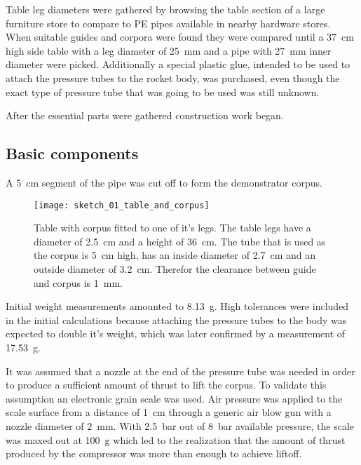 Table leg diameters were gathered by browsing the table section of a large furniture store to compare to PE pipes available in nearby hardware stores. When suitable guides and corpora were found they were compared until a \SI{37}{\centi\meter} high side table \cite{table} with a leg diameter of \SI{25}{\milli\meter} and a pipe with \SI{27}{\milli\meter} inner diameter were picked. Additionally a special plastic glue, intended to be used to attach the pressure tubes to the rocket body, was purchased, even though the exact type of pressure tube that was going to be used was still unknown.

After the essential parts were gathered construction work began. 

\subsection{Basic components}
A \SI{5}{\centi\meter} segment of the pipe was cut off to form the demonstrator corpus.

\begin{figure}[h]
\centering

\texttt{[image: sketch\_01\_table\_and\_corpus]}

\caption{Table with corpus fitted to one of it's legs. The table legs have a diameter of \SI{2,5}{\centi\meter} and a height of \SI{36}{\centi\meter}. The tube that is used as the corpus is \SI{5}{\centi\meter} high, has an inside diameter of \SI{2,7}{\centi\meter} and an outside diameter of \SI{3,2}{\centi\meter}. Therefor the clearance between guide and corpus is \SI{1}{\milli\meter}.}
\end{figure}


Initial weight measurements amounted to \SI{8,13}{\gram}. High tolerances were included in the initial calculations because attaching the pressure tubes to the body was expected to double it's weight, which was later confirmed by a measurement of \SI{17,53}{\gram}.

It was assumed that a nozzle at the end of the pressure tube was needed in order to produce a sufficient amount of thrust to lift the corpus.
To validate this assumption an electronic grain scale was used. Air pressure was applied to the scale surface from a distance of \SI{1}{\centi\meter} through a generic air blow gun with a nozzle diameter of \SI{2}{\milli\meter}. With \SI{2,5}{\bar} out of \SI{8}{\bar} available pressure, the scale was maxed out at \SI{100}{\gram} which led to the realization that the amount of thrust produced by the compressor was more than enough to achieve liftoff. 


